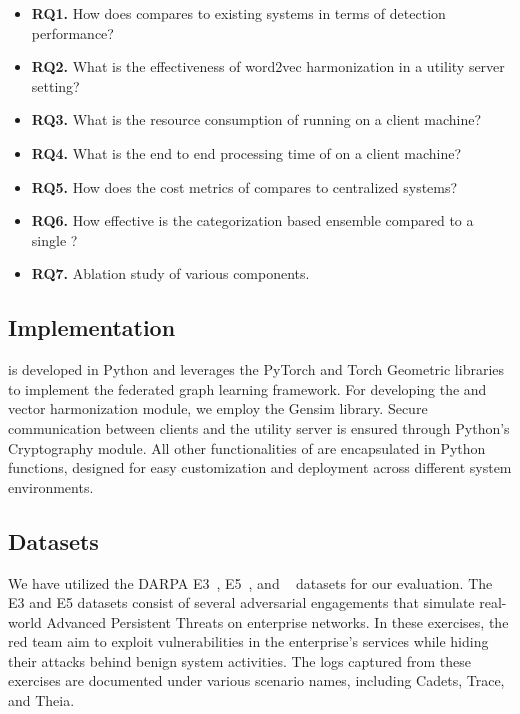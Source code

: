 \begin{itemize}[leftmargin=*]
\item \textbf{RQ1.} How does \Sys compares to existing systems in terms of detection performance?
\item \textbf{RQ2.} What is the effectiveness of word2vec harmonization in a utility server setting?
\item \textbf{RQ3.} What is the resource consumption of \Sys running on a client machine?
\item \textbf{RQ4.} What is the end to end processing time of \Sys on a client machine?
\item \textbf{RQ5.} How does the cost metrics of \Sys compares to centralized systems?
\item \textbf{RQ6.} How effective is the categorization based \gnnshort ensemble compared to a single \gnnshort?
\item \textbf{RQ7.} Ablation study of various \Sys components.
\end{itemize}

\subsection{Implementation}

\Sys is developed in Python and leverages the PyTorch and Torch Geometric libraries to implement the federated graph learning framework.  For developing the \wordvec and vector harmonization module, we employ the Gensim library. Secure communication between clients and the utility server is ensured through Python's Cryptography module. All other functionalities of \Sys are encapsulated in Python functions, designed for easy customization and deployment across different system environments.


\subsection{Datasets}
We have utilized the DARPA E3~\cite{darpae3}, E5~\cite{darpae5}, and \optc~\cite{darpaoptc} datasets for our evaluation. The E3 and E5 datasets consist of several adversarial engagements that simulate real-world Advanced Persistent Threats on enterprise networks. In these exercises, the red team aim to exploit vulnerabilities in the enterprise's services while hiding their attacks behind benign system activities. The logs captured from these exercises are documented under various scenario names, including Cadets, Trace, and Theia.

